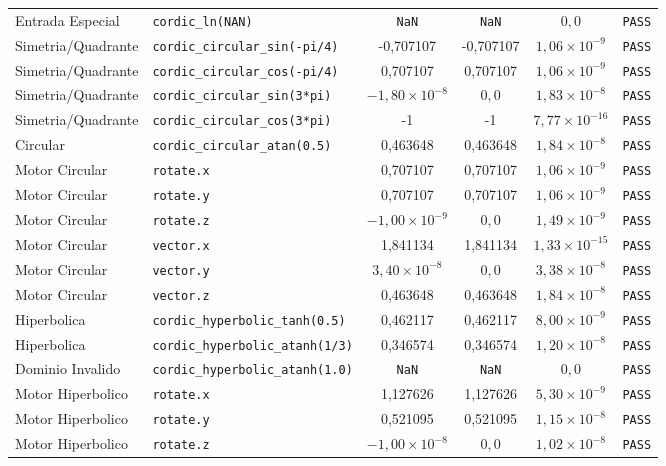 \begin{table}[htbp]
{\begin{tabular}{llcccc}
Entrada Especial & \texttt{cordic\_ln(NAN)} & \texttt{NaN} & \texttt{NaN} & $0{,}0$ & \texttt{PASS} \\
Simetria/Quadrante & \texttt{cordic\_circular\_sin(-pi/4)} & -0,707107 & -0,707107 & $1,06 \times 10^{-9}$ & \texttt{PASS} \\
Simetria/Quadrante & \texttt{cordic\_circular\_cos(-pi/4)} & 0,707107 & 0,707107 & $1,06 \times 10^{-9}$ & \texttt{PASS} \\
Simetria/Quadrante & \texttt{cordic\_circular\_sin(3*pi)} & $-1,80 \times 10^{-8}$ & $0{,}0$ & $1,83 \times 10^{-8}$ & \texttt{PASS} \\
Simetria/Quadrante & \texttt{cordic\_circular\_cos(3*pi)} & -1 & -1 & $7,77 \times 10^{-16}$ & \texttt{PASS} \\
Circular & \texttt{cordic\_circular\_atan(0.5)} & 0,463648 & 0,463648 & $1,84 \times 10^{-8}$ & \texttt{PASS} \\
Motor Circular & \texttt{rotate.x} & 0,707107 & 0,707107 & $1,06 \times 10^{-9}$ & \texttt{PASS} \\
Motor Circular & \texttt{rotate.y} & 0,707107 & 0,707107 & $1,06 \times 10^{-9}$ & \texttt{PASS} \\
Motor Circular & \texttt{rotate.z} & $-1,00 \times 10^{-9}$ & $0{,}0$ & $1,49 \times 10^{-9}$ & \texttt{PASS} \\
Motor Circular & \texttt{vector.x} & 1,841134 & 1,841134 & $1,33 \times 10^{-15}$ & \texttt{PASS} \\
Motor Circular & \texttt{vector.y} & $3,40 \times 10^{-8}$ & $0{,}0$ & $3,38 \times 10^{-8}$ & \texttt{PASS} \\
Motor Circular & \texttt{vector.z} & 0,463648 & 0,463648 & $1,84 \times 10^{-8}$ & \texttt{PASS} \\
Hiperbolica & \texttt{cordic\_hyperbolic\_tanh(0.5)} & 0,462117 & 0,462117 & $8,00 \times 10^{-9}$ & \texttt{PASS} \\
Hiperbolica & \texttt{cordic\_hyperbolic\_atanh(1/3)} & 0,346574 & 0,346574 & $1,20 \times 10^{-8}$ & \texttt{PASS} \\
Dominio Invalido & \texttt{cordic\_hyperbolic\_atanh(1.0)} & \texttt{NaN} & \texttt{NaN} & $0{,}0$ & \texttt{PASS} \\
Motor Hiperbolico & \texttt{rotate.x} & 1,127626 & 1,127626 & $5,30 \times 10^{-9}$ & \texttt{PASS} \\
Motor Hiperbolico & \texttt{rotate.y} & 0,521095 & 0,521095 & $1,15 \times 10^{-8}$ & \texttt{PASS} \\
Motor Hiperbolico & \texttt{rotate.z} & $-1,00 \times 10^{-8}$ & $0{,}0$ & $1,02 \times 10^{-8}$ & \texttt{PASS} \\

\end{tabular}}
\end{table}
